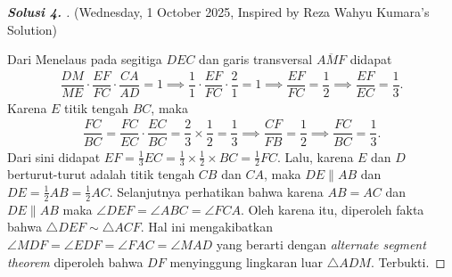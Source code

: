 \begin{proof}[\textbf{Solusi 4. }] (Wednesday, 1 October 2025, Inspired by Reza Wahyu Kumara's Solution)
    
    Dari Menelaus pada segitiga $DEC$ dan garis transversal $\overline{AMF}$ didapat
    \begin{align*}
        \dfrac{DM}{ME}\cdot \dfrac{EF}{FC} \cdot \dfrac{CA}{AD} = 1 \implies
        \dfrac{1}{1}\cdot \dfrac{EF}{FC} \cdot \dfrac{2}{1} = 1 \implies
        \dfrac{EF}{FC} = \dfrac{1}{2} \implies
        \dfrac{EF}{EC} = \dfrac{1}{3}.
    \end{align*}
    Karena $E$ titik tengah $BC$, maka 
    \begin{align*}
        \dfrac{FC}{BC} = \dfrac{FC}{EC} \cdot \dfrac{EC}{BC} = \dfrac{2}{3} \times \dfrac{1}{2} = \dfrac{1}{3} \implies 
        \dfrac{CF}{FB} = \dfrac{1}{2} \implies
        \dfrac{FC}{BC} = \dfrac{1}{3}.
    \end{align*}
    Dari sini didapat $EF = \frac{1}{3}EC = \frac{1}{3}\times\frac{1}{2}\times BC = \frac{1}{2} FC$.
    Lalu, karena $E$ dan $D$ berturut-turut adalah titik tengah $CB$ dan $CA$, maka $DE \parallel AB$ dan $DE= \frac{1}{2}AB = \frac{1}{2}AC$. 
    Selanjutnya perhatikan bahwa karena $AB=AC$ dan $DE \parallel AB$ maka $\angle DEF = \angle ABC = \angle FCA$. 
    Oleh karena itu, diperoleh fakta bahwa $\triangle DEF \sim \triangle ACF$. 
    Hal ini mengakibatkan $\angle MDF = \angle EDF = \angle FAC = \angle MAD$ yang berarti dengan \textit{alternate segment theorem} diperoleh bahwa $DF$ menyinggung lingkaran luar $\triangle ADM$.
    Terbukti.

\end{proof}